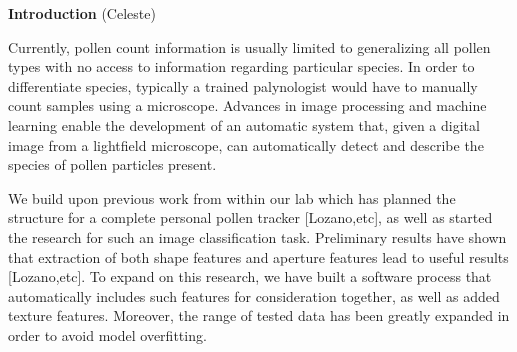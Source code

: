 \textbf{Introduction} (Celeste)
     
     Currently, pollen count information is usually limited to generalizing all pollen types with no access to information regarding particular species. In order to differentiate species, typically a trained palynologist would have to manually count samples using a microscope. Advances in image processing and machine learning enable the development of an automatic system that, given a digital image from a lightfield microscope, can automatically detect and describe the species of pollen particles present. 
     
We build upon previous work from within our lab which has planned the structure for a complete personal pollen tracker [Lozano,etc], as well as started the research for such an image classification task. Preliminary results have shown that extraction of both shape features and aperture features lead to useful results [Lozano,etc]. To expand on this research, we have built a software process that automatically includes such features for consideration together, as well as added texture features. Moreover, the range of tested data has been greatly expanded in order to avoid model overfitting. 

    